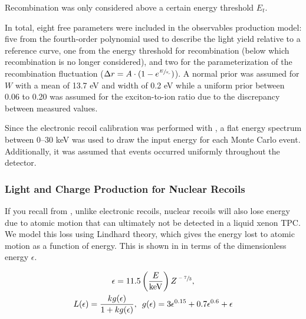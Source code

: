 Recombination was only considered above a certain energy threshold $E_t$.  

In total, eight free parameters were included in the observables production model: five from the fourth-order polynomial used to describe the light yield relative to a reference curve, one from the energy threshold for recombination (below which recombination is no longer considered), and two for the parameterization of the recombination fluctuation ($\Delta r = A \cdot (1 - e^{\sfrac{E}{\tau_r}})$).  A normal prior was assumed for $W$ with a mean of 13.7 eV and width of 0.2 eV while a uniform prior between 0.06 to 0.20 \cite{takahashi1975average, aprile2007observation} was assumed for the exciton-to-ion ratio due to the discrepancy between measured values.  



Since the electronic recoil calibration was performed with , a flat energy spectrum between 0--30 keV was used to draw the input energy for each Monte Carlo event.  Additionally, it was assumed that events occurred uniformly throughout the detector.



\subsubsection{Light and Charge Production for Nuclear Recoils}
\label{sec:xe1t_mc_observables_production_nr}

If you recall from , unlike electronic recoils, nuclear recoils will also lose energy due to atomic motion that can ultimately not be detected in a liquid xenon TPC.  We model this loss using Lindhard theory, which gives the energy lost to atomic motion as a function of energy.  This is shown in  in terms of the dimensionless energy $\epsilon$.

\begin{equation}
        \label{eqn:xe1t_lindhard}
        \begin{gathered}
                \epsilon = 11.5 \left( \frac{E}{\textrm{keV}} \right) Z^{\sfrac{-7}{3}}, \\
                L(\epsilon) = \frac{k g(\epsilon)}{1 + k g(\epsilon)}, \, \, \, g(\epsilon) = 3 \epsilon^{0.15} + 0.7 \epsilon^{0.6} + \epsilon
        \end{gathered}
\end{equation}

